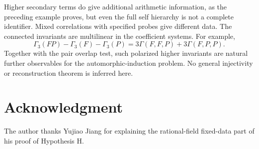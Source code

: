 \documentclass[11pt]{article}
\numberwithin{equation}{section}
\theoremstyle{remark}
\begin{document}
Higher secondary terms do give additional arithmetic information, as
the preceding example proves, but even the full self hierarchy is not
a complete identifier. Mixed correlations with specified probes give
different data. The connected invariants are multilinear in the
coefficient systems. For example,
\[
 \Gamma_3(FP)-\Gamma_3(F)-\Gamma_3(P)
 =3\Gamma(F,F,P)+3\Gamma(F,P,P).
\]
Together with the pair overlap test, such polarized higher invariants
are natural further observables for the automorphic-induction problem.
No general injectivity or reconstruction theorem is inferred here.


\section*{Acknowledgment}
The author thanks Yujiao Jiang for explaining the rational-field
fixed-data part of his proof of Hypothesis H.
\end{document}
